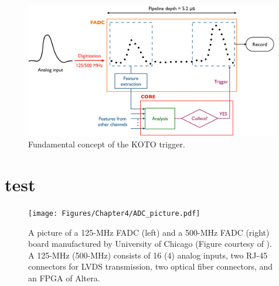 

\begin{figure}[h]
\begin{center}
\captionsetup{width=.99\linewidth}
\includegraphics[width=0.99\textwidth]{Figures/Chapter4/pipeline.pdf}
\caption{Fundamental concept of the KOTO trigger. }
\label{fig:pipeline}
\end{center}
\end{figure}




\section{test}


\parencite{125MHz_ADC}

\begin{figure}[h]
\begin{center}
\captionsetup{width=.99\linewidth}
\texttt{[image: Figures/Chapter4/ADC\_picture.pdf]}
\caption{A picture of a 125-MHz FADC (left) and a 500-MHz FADC (right) board manufactured by University of Chicago  (Figure courtesy of \parencite{mircea}). A 125-MHz (500-MHz) consists of 16 (4) analog inputs, two RJ-45 connectors for LVDS transmission, two optical fiber connectors, and an FPGA of Altera.}
\label{fig:ADC_picture}
\end{center}
\end{figure}


